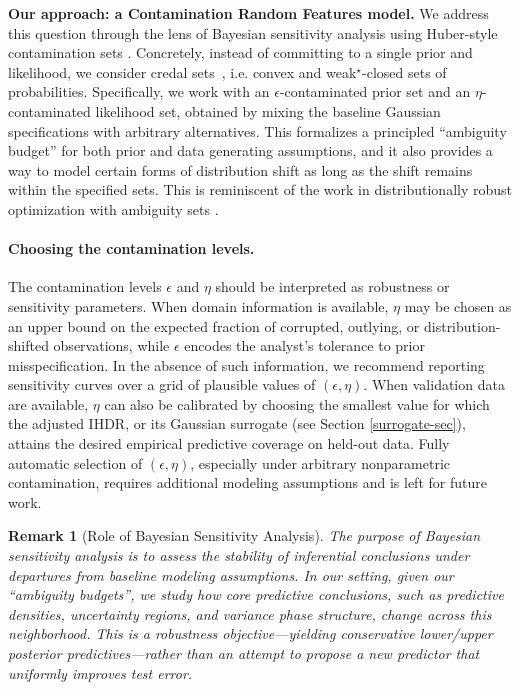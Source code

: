 \documentclass[12pt, english, oneside, a4paper]{article}
\newtheorem{remark}{Remark}
\begin{document}
\textbf{Our approach: a Contamination Random Features model.} We address this question through the lens of Bayesian sensitivity analysis \citep{berger} using Huber-style contamination sets \citep{walley,huber}. Concretely, instead of committing to a single prior and likelihood, we consider credal sets~\citep{levi2}, i.e. convex and weak$^\star$-closed sets of probabilities. Specifically, we work with an $\epsilon$-contaminated prior set and an $\eta$-contaminated likelihood set, obtained by mixing the baseline Gaussian specifications with arbitrary alternatives. This formalizes a principled ``ambiguity budget'' for both prior and data generating assumptions, and it also provides a way to model certain forms of distribution shift as long as the shift remains within the specified sets. This is reminiscent of the work in distributionally robust optimization with ambiguity sets   \citep{dellaporta2024distributionally,chen2026bulkcalibratedcredalambiguitysets}.

\paragraph{Choosing the contamination levels.}
The contamination levels \(\epsilon\) and \(\eta\) should be interpreted as robustness or sensitivity parameters. When domain information is available, \(\eta\) may be chosen as an upper bound on the expected fraction of corrupted, outlying, or distribution-shifted observations, while \(\epsilon\) encodes the analyst's tolerance to prior misspecification. In the absence of such information, we recommend reporting sensitivity curves over a grid of plausible values of \((\epsilon,\eta)\). When validation data are available, \(\eta\) can also be calibrated by choosing the smallest value for which the adjusted IHDR, or its Gaussian surrogate (see Section \ref{surrogate-sec}), attains the desired empirical predictive coverage on held-out data. Fully automatic selection of \((\epsilon,\eta)\), especially under arbitrary nonparametric contamination, requires additional modeling assumptions and is left for future work.

\begin{remark}[Role of Bayesian Sensitivity Analysis]
    The purpose of Bayesian sensitivity analysis is to assess the stability of inferential conclusions under departures from baseline modeling assumptions.
In our setting, given our ``ambiguity budgets'', we study how core predictive conclusions, such as predictive densities, uncertainty regions, and variance phase structure, change across this neighborhood.
This is a robustness objective---yielding conservative lower/upper posterior predictives---rather than an attempt to propose a new predictor that uniformly improves test error.
\end{remark}
\end{document}
